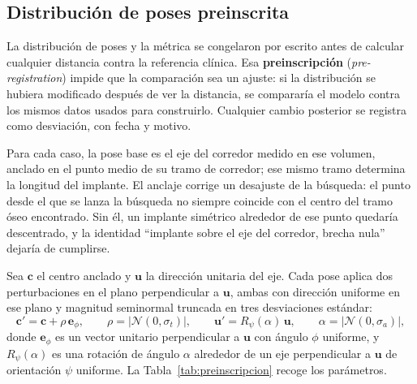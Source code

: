 \subsection{Distribución de poses preinscrita}\label{sec:poses}

La distribución de poses y la métrica se congelaron por escrito antes de calcular cualquier distancia contra la referencia clínica. Esa \textbf{preinscripción} (\emph{pre-registration}) impide que la comparación sea un ajuste: si la distribución se hubiera modificado después de ver la distancia, se compararía el modelo contra los mismos datos usados para construirlo. Cualquier cambio posterior se registra como desviación, con fecha y motivo.

Para cada caso, la pose base es el eje del corredor medido en ese volumen, anclado en el punto medio de su tramo de corredor; ese mismo tramo determina la longitud del implante. El anclaje corrige un desajuste de la búsqueda: el punto desde el que se lanza la búsqueda no siempre coincide con el centro del tramo óseo encontrado. Sin él, un implante simétrico alrededor de ese punto quedaría descentrado, y la identidad ``implante sobre el eje del corredor, brecha nula'' dejaría de cumplirse.

Sea $\mathbf{c}$ el centro anclado y $\mathbf{u}$ la dirección unitaria del eje. Cada pose aplica dos perturbaciones en el plano perpendicular a $\mathbf{u}$, ambas con dirección uniforme en ese plano y magnitud seminormal truncada en tres desviaciones estándar:
\begin{equation}
\mathbf{c}' = \mathbf{c} + \rho\,\mathbf{e}_{\phi}, \qquad \rho = |\mathcal{N}(0, \sigma_t)|, \qquad \mathbf{u}' = R_{\psi}(\alpha)\,\mathbf{u}, \qquad \alpha = |\mathcal{N}(0, \sigma_a)|,
\label{eq:pose}
\end{equation}
donde $\mathbf{e}_{\phi}$ es un vector unitario perpendicular a $\mathbf{u}$ con ángulo $\phi$ uniforme, y $R_{\psi}(\alpha)$ es una rotación de ángulo $\alpha$ alrededor de un eje perpendicular a $\mathbf{u}$ de orientación $\psi$ uniforme. La Tabla~\ref{tab:preinscripcion} recoge los parámetros.

